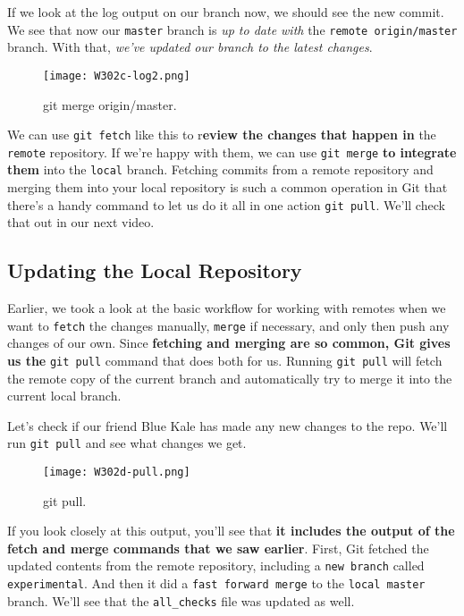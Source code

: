	If we look at the log output on our branch now, we should see the new commit. We see that now our \verb|master| branch is \textit{up to date with} the \verb|remote origin/master| branch. With that, \textit{we've updated our branch to the latest changes}.
	
	\begin{figure} 
		\caption{git merge origin/master.}
		\centering
		\texttt{[image: W302c-log2.png]}
		\label{W302c-log2}
	\end{figure}
	
	We can use \verb|git fetch| like this to r\textbf{eview the changes that happen in} the \verb|remote| repository. If we're happy with them, we can use \verb|git merge| \textbf{to integrate them} into the \verb|local| branch. Fetching commits from a remote repository and merging them into your local repository is such a common operation in Git that there's a handy command to let us do it all in one action \verb|git pull|. We'll check that out in our next video.

	\subsection{Updating the Local Repository} \label{W302d}

	Earlier, we took a look at the basic workflow for working with remotes when we want to \verb|fetch| the changes manually, \verb|merge| if necessary, and only then push any changes of our own. Since \textbf{fetching and merging are so common, Git gives us the} \verb|git pull| command that does both for us. Running \verb|git pull| will fetch the remote copy of the current branch and automatically try to merge it into the current local branch.
	
	Let's check if our friend Blue Kale has made any new changes to the repo. We'll run \verb|git pull| and see what changes we get.
	
	\begin{figure} 
		\caption{git pull.}
		\centering
		\texttt{[image: W302d-pull.png]}
		\label{W302d-pull}
	\end{figure}
	
	
	If you look closely at this output, you'll see that \textbf{it includes the output of the fetch and merge commands that we saw earlier}. First, Git fetched the updated contents from the remote repository, including a \verb|new branch| called \verb|experimental|. And then it did a \verb|fast forward merge| to the \verb|local master| branch. We'll see that the \verb|all_checks| file was updated as well.
	
